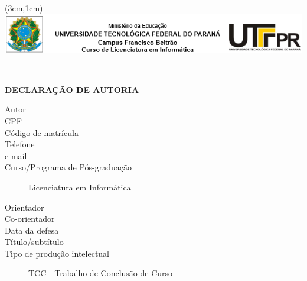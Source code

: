 \documentclass[12pt]{article}
\begin{document}
\linespread{1} 

\thispagestyle{empty} 

\begin{center}
    \begin{textblock*}{\linewidth}(3cm,1cm)%
    \centering
     \includegraphics[width=\linewidth]{debib/logo.png}
    \end{textblock*} ~\\[1em]
\end{center}

\vspace{\fill}
\begin{center}
\begin{large}
\textbf{DECLARAÇÃO DE AUTORIA}
\end{large}
\end{center}

\vspace{\fill}  

\begin{description} 
\item[Autor] \discente
\item[CPF] \cpf  
\item[Código de matrícula] \RAouMatricula
\item[Telefone] \telefonecomDDD 
\item[e-mail] \email
\item[Curso/Programa de Pós-graduação] Licenciatura em Informática
\item[Orientador] \proforientador
\item[Co-orientador] \profcoorientador
\item[Data da defesa] 
\item[Título/subtítulo] \titulotrabalho
\item[Tipo de produção intelectual] TCC - Trabalho de Conclusão de Curso 
\end{description}

\vspace{\fill}
\end{document}
